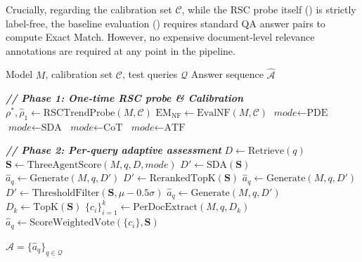 \documentclass[11pt]{article}
\theoremstyle{definition}
\begin{document}
Crucially, regarding the calibration set \(\mathcal{C}\), while the RSC probe itself () is strictly label-free, the baseline evaluation () requires standard QA answer pairs to compute Exact Match. However, no expensive document-level relevance annotations are required at any point in the pipeline.

\begin{algorithm}[t]
\footnotesize
\caption{The MADARA routing protocol.}
\label{alg:madara}
\begin{algorithmic}[1]
\Require Model \(M\), calibration set \(\mathcal{C}\), test queries \(\mathcal{Q}\)
\Ensure Answer sequence \(\hat{\mathcal{A}}\)

\Statex
\Statex \textbf{\textit{// Phase 1: One-time RSC probe \& Calibration}}
\State \(\rho^*, \hat{\rho}_1 \leftarrow \text{RSCTrendProbe}(M, \mathcal{C})\)
\State \(\text{EM}_{\text{NF}} \leftarrow \text{EvalNF}(M, \mathcal{C})\)
  \State \(\textit{mode} \leftarrow \text{PDE}\)
  \State \(\textit{mode} \leftarrow \text{SDA}\)
  \State \(\textit{mode} \leftarrow \text{CoT}\)
\Else
  \State \(\textit{mode} \leftarrow \text{ATF}\)
\EndIf

\Statex
\Statex \textbf{\textit{// Phase 2: Per-query adaptive assessment}}
  \State \(D \leftarrow \text{Retrieve}(q)\)
  \State \(\mathbf{S} \leftarrow \text{ThreeAgentScore}(M, q, D, \textit{mode})\)
    \State \(D' \leftarrow \text{SDA}(\mathbf{S})\)
    \State \(\hat{a}_q \leftarrow \text{Generate}(M, q, D')\)
    \State \(D' \leftarrow \text{RerankedTopK}(\mathbf{S})\)
    \State \(\hat{a}_q \leftarrow \text{Generate}(M, q, D')\)
    \State \(D' \leftarrow \text{ThresholdFilter}(\mathbf{S}, \mu - 0.5\sigma)\)
    \State \(\hat{a}_q \leftarrow \text{Generate}(M, q, D')\)
  \Else {}
    \State \(D_k \leftarrow \text{TopK}(\mathbf{S})\)
    \State \(\{c_i\}_{i=1}^{k} \leftarrow \text{PerDocExtract}(M, q, D_k)\)
    \State \(\hat{a}_q \leftarrow \text{ScoreWeightedVote}(\{c_i\}, \mathbf{S})\)
  \EndIf
\EndFor

\Statex
\State \Return \(\hat{\mathcal{A}} = \{\hat{a}_q\}_{q \in \mathcal{Q}}\)
\end{algorithmic}
\end{algorithm}
\end{document}

